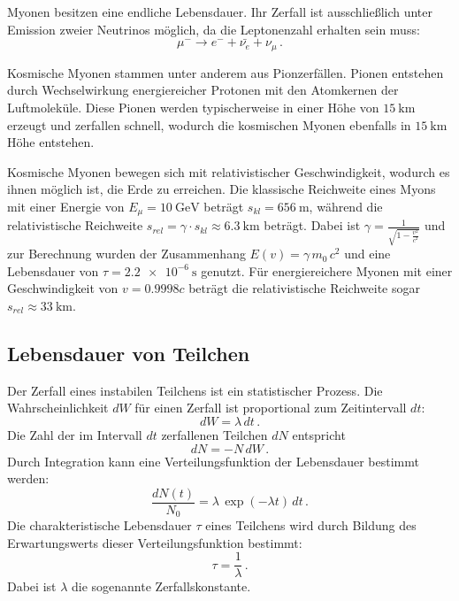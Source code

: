 Myonen besitzen eine endliche Lebensdauer. Ihr Zerfall ist ausschließlich unter Emission zweier Neutrinos möglich, da die Leptonenzahl erhalten sein muss:
\begin{equation*}
    \mu^- \rightarrow e^- + \bar{\nu_{e}} + \nu_{\mu} \, .
\end{equation*}

Kosmische Myonen stammen unter anderem aus Pionzerfällen. 
Pionen entstehen durch Wechselwirkung energiereicher Protonen mit den Atomkernen der Luftmoleküle. 
Diese Pionen werden typischerweise in einer Höhe von $\SI{15}{\kilo\metre}$ erzeugt und zerfallen schnell, 
wodurch die kosmischen Myonen ebenfalls in $\SI{15}{\kilo\metre}$ Höhe entstehen. \cite{Grupen}

Kosmische Myonen bewegen sich mit relativistischer Geschwindigkeit, wodurch es ihnen möglich ist, die Erde zu erreichen. 
Die klassische Reichweite eines Myons mit einer Energie von $E_{\mu} = \SI{10}{\giga\electronvolt}$ 
beträgt $s_{kl} = \SI{656}{\meter}$, während die relativistische 
Reichweite $s_{rel} = \gamma \cdot s_{kl} \approx \SI{6.3}{\kilo\metre}$ beträgt. 
Dabei ist $\gamma = \frac{1}{\sqrt{1 - \frac{v^2}{c^2}}}$ und zur 
Berechnung wurden der Zusammenhang $E(v) = \gamma \, m_0 \, c^2$ und eine 
Lebensdauer von $\tau = \SI{2.2e-6}{\second}$ genutzt. Für energiereichere 
Myonen mit einer Geschwindigkeit von $v = \num{0.9998} c$ beträgt die relativistische 
Reichweite sogar $s_{rel} \approx \SI{33}{\kilo\metre}$.


\subsection{Lebensdauer von Teilchen}
Der Zerfall eines instabilen Teilchens ist ein statistischer Prozess. Die Wahrscheinlichkeit $dW$ für einen Zerfall ist proportional zum Zeitintervall $dt$:
\begin{equation*}
    dW = \lambda \, dt \, .
\end{equation*}
Die Zahl der im Intervall $dt$ zerfallenen Teilchen $dN$ entspricht
\begin{equation*}
    dN = - N \, dW \, .
\end{equation*}
Durch Integration kann eine Verteilungsfunktion der Lebensdauer bestimmt werden:
\begin{equation}
    \frac{dN(t)}{N_0} = \lambda \, \exp(- \lambda t) \, dt \, .
    \label{eq:verteilung}
\end{equation}
Die charakteristische Lebensdauer $\tau$ eines Teilchens wird durch Bildung des Erwartungswerts dieser Verteilungsfunktion bestimmt:
\begin{equation}
    \tau = \frac{1}{\lambda} \, .
    \label{eq:tau}
\end{equation}
Dabei ist $\lambda$ die sogenannte Zerfallskonstante.


